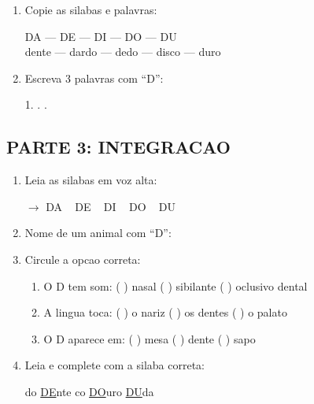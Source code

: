 \begin{exercicio}
\begin{enumerate}[resume]
  \item Copie as silabas e palavras:
  \begin{center}
  DA --- DE --- DI --- DO --- DU\\
  dente --- dardo --- dedo --- disco --- duro
  \end{center}

  \item Escreva 3 palavras com ``D'':
  \begin{center}
  1. \underline{\hspace{4cm}} . \underline{\hspace{4cm}} . \underline{\hspace{4cm}}
  \end{center}
\end{enumerate}

\subsection*{PARTE 3: INTEGRACAO}

\begin{enumerate}[resume]
  \item Leia as silabas em voz alta:
  \begin{center}
  $\rightarrow$ DA  ~  DE  ~  DI  ~  DO  ~  DU
  \end{center}

  \item Nome de um animal com ``D'':
  \begin{center}
  \underline{\hspace{6cm}}
  \end{center}

  \item Circule a opcao correta:
  \begin{enumerate}[label=(\alph*)]
    \item O D tem som: ( ) nasal ( ) sibilante ( ) oclusivo dental
    \item A lingua toca: ( ) o nariz ( ) os dentes ( ) o palato
    \item O D aparece em: ( ) mesa ( ) dente ( ) sapo
  \end{enumerate}

  \item Leia e complete com a silaba correta:
  \begin{center}
  do \quad \underline{DE}nte \quad {}co \quad \underline{DO}uro \quad \underline{DU}da
  \end{center}
\end{enumerate}
\end{exercicio}

